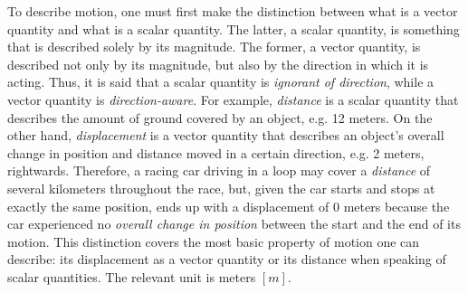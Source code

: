 \begin{figure}[h!]
	\centering
	\hspace{3cm}
\end{figure}


To describe motion, one must first make the distinction between what is a vector quantity and what is a scalar quantity. The latter, a scalar quantity, is something that is described solely by its magnitude. The former, a vector quantity, is described not only by its magnitude, but also by the direction in which it is acting. Thus, it is said that a scalar quantity is \emph{ignorant of direction}, while a vector quantity is \emph{direction-aware}. For example, \emph{distance} is a scalar quantity that describes the amount of ground covered by an object, e.g. 12 meters. On the other hand, \emph{displacement} is a vector quantity that describes an object's overall change in position and distance moved in a certain direction, e.g. 2 meters, rightwards. Therefore, a racing car driving in a loop may cover a \emph{distance} of several kilometers throughout the race, but, given the car starts and stops at exactly the same position, ends up with a displacement of 0 meters because the car experienced no \emph{overall change in position} between the start and the end of its motion. This distinction covers the most basic property of motion one can describe: its displacement as a vector quantity or its distance when speaking of scalar quantities. The relevant unit is meters $[m]$.

